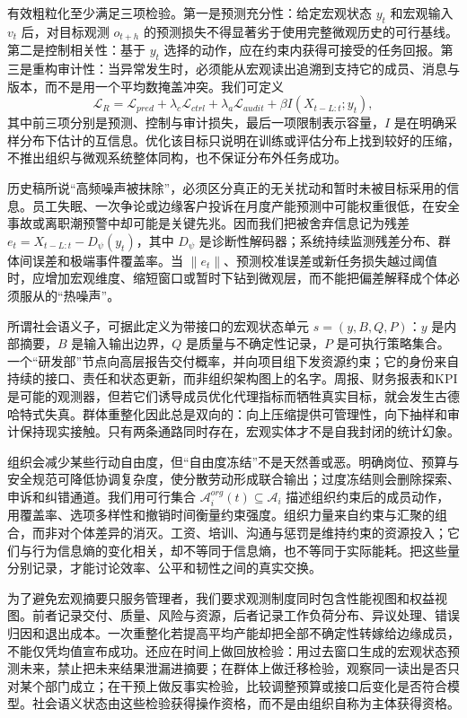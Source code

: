 有效粗粒化至少满足三项检验。第一是预测充分性：给定宏观状态 $y_t$ 和宏观输入 $v_t$ 后，对目标观测 $o_{t+h}$ 的预测损失不得显著劣于使用完整微观历史的可行基线。第二是控制相关性：基于 $y_t$ 选择的动作，应在约束内获得可接受的任务回报。第三是重构审计性：当异常发生时，必须能从宏观读出追溯到支持它的成员、消息与版本，而不是用一个平均数掩盖冲突。我们可定义
\begin{equation}
\mathcal L_R=\mathcal L_{pred}+\lambda_c\mathcal L_{ctrl}+\lambda_a\mathcal L_{audit}+\beta I(X_{t-L:t};y_t),
\end{equation}
其中前三项分别是预测、控制与审计损失，最后一项限制表示容量，$I$ 是在明确采样分布下估计的互信息。优化该目标只说明在训练或评估分布上找到较好的压缩，不推出组织与微观系统整体同构，也不保证分布外任务成功。

历史稿所说“高频噪声被抹除”，必须区分真正的无关扰动和暂时未被目标采用的信息。员工失眠、一次争论或边缘客户投诉在月度产能预测中可能权重很低，在安全事故或离职潮预警中却可能是关键先兆。因而我们把被舍弃信息记为残差 $e_t=X_{t-L:t}-D_\psi(y_t)$，其中 $D_\psi$ 是诊断性解码器；系统持续监测残差分布、群体间误差和极端事件覆盖率。当 $\|e_t\|$、预测校准误差或新任务损失越过阈值时，应增加宏观维度、缩短窗口或暂时下钻到微观层，而不能把偏差解释成个体必须服从的“热噪声”。

所谓社会语义子，可据此定义为带接口的宏观状态单元 $s=(y,B,Q,P)$：$y$ 是内部摘要，$B$ 是输入输出边界，$Q$ 是质量与不确定性记录，$P$ 是可执行策略集合。一个“研发部”节点向高层报告交付概率，并向项目组下发资源约束；它的身份来自持续的接口、责任和状态更新，而非组织架构图上的名字。周报、财务报表和KPI是可能的观测器，但若它们诱导成员优化代理指标而牺牲真实目标，就会发生古德哈特式失真。群体重整化因此总是双向的：向上压缩提供可管理性，向下抽样和审计保持现实接触。只有两条通路同时存在，宏观实体才不是自我封闭的统计幻象。

组织会减少某些行动自由度，但“自由度冻结”不是天然善或恶。明确岗位、预算与安全规范可降低协调复杂度，使分散劳动形成联合输出；过度冻结则会删除探索、申诉和纠错通道。我们用可行集合 $\mathcal A_i^{org}(t)\subseteq\mathcal A_i$ 描述组织约束后的成员动作，用覆盖率、选项多样性和撤销时间衡量约束强度。组织力量来自约束与汇聚的组合，而非对个体差异的消灭。工资、培训、沟通与惩罚是维持约束的资源投入；它们与行为信息熵的变化相关，却不等同于信息熵，也不等同于实际能耗。把这些量分别记录，才能讨论效率、公平和韧性之间的真实交换。

为了避免宏观摘要只服务管理者，我们要求观测制度同时包含性能视图和权益视图。前者记录交付、质量、风险与资源，后者记录工作负荷分布、异议处理、错误归因和退出成本。一次重整化若提高平均产能却把全部不确定性转嫁给边缘成员，不能仅凭均值宣布成功。还应在时间上做回放检验：用过去窗口生成的宏观状态预测未来，禁止把未来结果泄漏进摘要；在群体上做迁移检验，观察同一读出是否只对某个部门成立；在干预上做反事实检验，比较调整预算或接口后变化是否符合模型。社会语义状态由这些检验获得操作资格，而不是由组织自称为主体获得资格。

